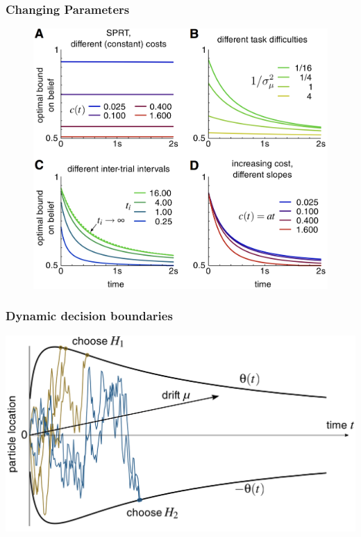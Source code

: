 \documentclass[xcolor=dvipsnames]{beamer} %
\begin{document}
\begin{frame} %
	\frametitle{Changing Parameters}
	\begin{figure}
	    \includegraphics[height=.8\textheight]{Parameters.png}
	\end{figure}
\end{frame}














\begin{frame}
  \frametitle{Dynamic decision boundaries}
    \includegraphics[width=\textwidth]{DDM.png}
\end{frame}
\end{document}
